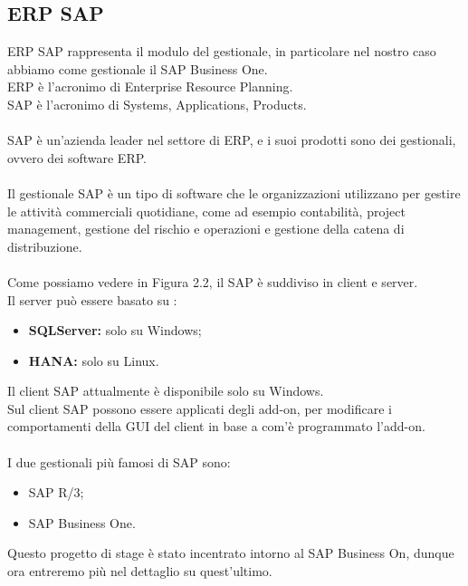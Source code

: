 \subsection{ERP SAP}
\vspace{1em}
ERP SAP rappresenta il modulo del gestionale, in particolare nel nostro caso abbiamo come gestionale il SAP Business One.\\
ERP è l'acronimo di Enterprise Resource Planning.\\SAP è l'acronimo di Systems, Applications, Products.\\\\
SAP è un'azienda leader nel settore di ERP, e i suoi prodotti sono dei gestionali, ovvero dei software ERP.\\\\
Il gestionale SAP è un tipo di software che le organizzazioni utilizzano per gestire le attività commerciali quotidiane, come ad esempio contabilità, project management, gestione del rischio e operazioni e gestione della catena di distribuzione.\\\\
Come possiamo vedere in Figura 2.2, il SAP è suddiviso in client e server.\\
Il server può essere basato su :
\begin{itemize}
	\item \textbf{SQLServer:} solo su Windows;
	\item \textbf{HANA:} solo su Linux.
\end{itemize}
Il client SAP attualmente è disponibile solo su Windows.\\Sul client SAP possono essere applicati degli add-on, per modificare i comportamenti della GUI del client in base a com'è programmato l'add-on.\\\\
I due gestionali più famosi di SAP sono:
\begin{itemize}
	\item SAP R/3;
	\item SAP Business One.
\end{itemize}
Questo progetto di stage è stato incentrato intorno al SAP Business On, dunque ora entreremo più nel dettaglio su quest'ultimo.
\newpage
